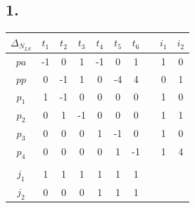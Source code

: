 \documentclass[12pt, paper=a4]{article}
\begin{document}
\subsection*{1.}
\begin{center}
\begin{tabular}{ | c | c c c c c c | c | c | c |}
	\hline
	$\Delta_{N_{LS}}$ & $t_1$ & $t_2$ & $t_3$ & $t_4$ & $t_5$ & $t_6$ & \hspace*{10pt} & $i_1$ & $i_2$\\
	\hline
	$pa$ & -1 & 0 & 1 & -1 & 0 & 1 & & 1 & 0\\
	$pp$ & 0 & -1 & 1 & 0 & -4 & 4 & & 0 & 1\\
	$p_1$ & 1 & -1 & 0 & 0 & 0 & 0 & & 1 & 0\\
	$p_2$ & 0 & 1 & -1 & 0 & 0 & 0 & & 1 & 1\\
	$p_3$ & 0 & 0 & 0 & 1 & -1 & 0 & & 1 & 0\\
	$p_4$ & 0 & 0 & 0 & 0 & 1 & -1 & & 1 & 4\\
	\hline
	& & & & & &\\ \cline{1-7}
	$j_1$ & 1 & 1 & 1 & 1 & 1 & 1\\
	$j_2$ & 0 & 0 & 0 & 1 & 1 & 1\\
	\cline{1-7}
\end{tabular}
\end{center}
\end{document}

